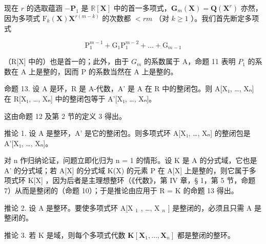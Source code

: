 现在 \(r\) 的选取蕴涵 \(-\mathbf{P}_1\) 是 \(\mathbb{R}[\mathbf{X}]\) 中的首一多项式，\(\mathbf{G}_m(\mathbf{X}) = \mathbf{Q}(\mathbf{X}^r)\) 亦然，因为多项式 \(\mathrm{F}_k(\mathbf{X})\mathbf{X}^{r(m - k)}\) 的次数都 \(< rm\) （对 \(k \geqslant 1\) ）。我们首先断定多项式

\[
\mathrm{P} _ {1} ^ {m - 1} + \mathrm{G} _ {1} \mathrm{P} _ {1} ^ {m - 2} + \dots + \mathrm{G} _ {m - 1}
\]

（R{[}X{]} 中的）也是首一的；此外，由于 \(G_{m}\) 的系数属于 A，命题 11 表明 \(P_{1}\) 的系数在 A 上是整的，因而 P 的系数当然在 A 上是整的。

命题 13. 设 A 是环，R 是 A-代数，A' 是 A 在 R 中的整闭包。则 A{[}X₁, \ldots, Xₙ{]} 在 R{[}X₁, \ldots, Xₙ{]} 中的整闭包等于 A'{[}X₁, \ldots, Xₙ{]}。

这由命题 12 及第 2 节的定义 3 得出。

推论 1. 设 A 是整环，A' 是它的整闭包。则多项式环 A{[}X₁, \ldots, Xₙ{]} 的整闭包是 A'{[}X₁, \ldots, Xₙ{]}。

对 n 作归纳论证，问题立即化归为 n = 1 的情形。设 K 是 A 的分式域，它也是 A' 的分式域；若 A{[}X{]} 的分式域 K(X) 的元素 P 在 A{[}X{]} 上是整的，则它属于多项式环 K{[}X{]} ，因为后者是主理想整环（《代数》，第 IV 章，§ 1，第 5 节，命题 7）从而是整闭的（命题 10）；于是推论由应用于 R = K 的命题 13 得出。

推论 2. 设 A 是整环。要使多项式环 A{[}X \(_{1}\) , \ldots, X \(_{n}\) {]} 是整闭的，必须且只需 A 是整闭的。

推论 3. 若 K 是域，则每个多项式代数 \(\mathbf{K}[\mathbf{X}_1,\ldots ,\mathbf{X}_n]\) 都是整闭的整环。

